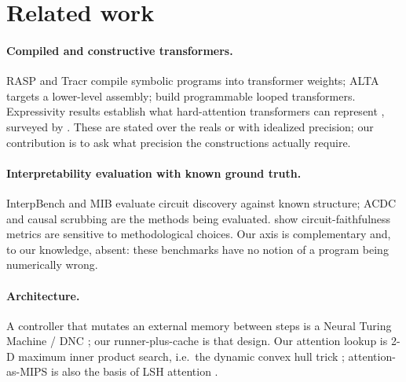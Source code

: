 \documentclass{article}
\theoremstyle{definition}
\begin{document}
\section{Related work}

\paragraph{Compiled and constructive transformers.} RASP
\citep{weiss2021thinking} and Tracr \citep{lindner2023tracr} compile symbolic
programs into transformer weights; ALTA \citep{shaw2025alta} targets a lower-level
assembly; \citet{giannou2023looped} build programmable looped transformers.
Expressivity results establish what hard-attention transformers can represent
\citep{perez2019turing,perez2021attention,hahn2020theoretical,barcelo2024logical,merrill2023parallelism,merrill2023logic},
surveyed by \citet{strobl2024formal}. These are stated over the reals or with
idealized precision; our contribution is to ask what precision the constructions
actually require.

\paragraph{Interpretability evaluation with known ground truth.} InterpBench
\citep{gupta2024interpbench} and MIB \citep{mueller2025mib} evaluate circuit
discovery against known structure; ACDC \citep{conmy2023acdc} and causal
scrubbing \citep{chan2022causalscrubbing} are the methods being evaluated.
\citet{miller2024faithfulness} show circuit-faithfulness metrics are sensitive to
methodological choices. Our axis is complementary and, to our knowledge, absent:
these benchmarks have no notion of a program being numerically wrong.

\paragraph{Architecture.} A controller that mutates an external memory between
steps is a Neural Turing Machine / DNC
\citep{graves2014neural,graves2016hybrid}; our runner-plus-cache is that design.
Our attention lookup is 2-D maximum inner product search, i.e.\ the dynamic
convex hull trick \citep{overmars1981maintenance,brodal2002dynamic,li2026lichao};
attention-as-MIPS is also the basis of LSH attention
\citep{shrivastava2014asymmetric,kitaev2020reformer}.
\end{document}
